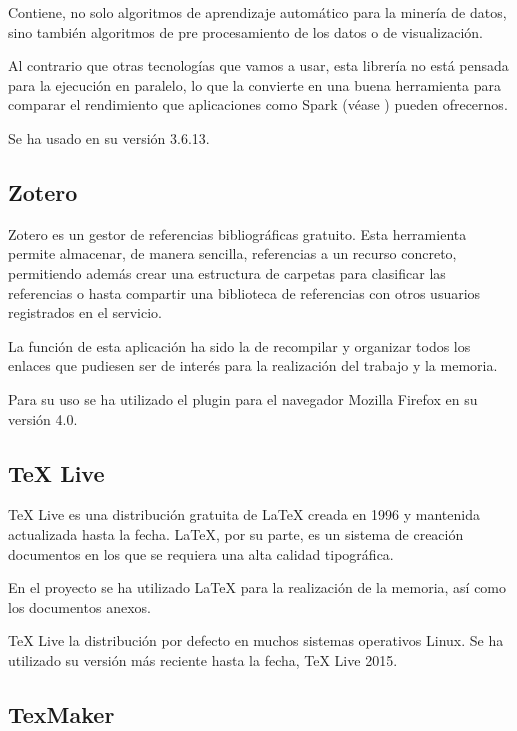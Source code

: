 Contiene, no solo algoritmos de aprendizaje automático para la minería de datos, sino también algoritmos de pre procesamiento de los datos o de visualización.

Al contrario que otras tecnologías que vamos a usar, esta librería no está pensada para la ejecución en paralelo, lo que la convierte en una buena herramienta para comparar el rendimiento que aplicaciones como Spark (véase ) pueden ofrecernos.

Se ha usado en su versión 3.6.13.




\subsection{Zotero}
Zotero es un gestor de referencias bibliográficas gratuito. Esta herramienta permite almacenar, de manera sencilla, referencias a un recurso concreto, permitiendo además crear una estructura de carpetas para clasificar las referencias o hasta compartir una biblioteca de referencias con otros usuarios registrados en el servicio.

La función de esta aplicación ha sido la de recompilar y organizar todos los enlaces que pudiesen ser de interés para la realización del trabajo y la memoria.

Para su uso se ha utilizado el plugin para el navegador Mozilla Firefox en su versión 4.0.

\subsection{TeX Live}
TeX Live es una distribución gratuita de LaTeX creada en 1996 y mantenida actualizada hasta la fecha. LaTeX, por su parte, es un sistema de creación documentos en los que se requiera una alta calidad tipográfica.

En el proyecto se ha utilizado LaTeX para la realización de la memoria, así como los documentos anexos.

TeX Live la distribución por defecto en muchos sistemas operativos Linux. Se ha utilizado su versión más reciente hasta la fecha, TeX Live 2015.

\subsection{TexMaker}

